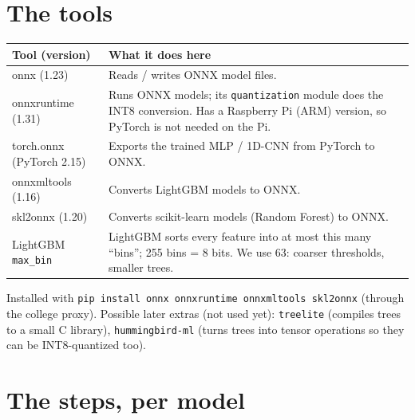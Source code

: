 \documentclass[11pt]{article}
\begin{document}
\section{The tools}
\begin{longtable}{@{}>{\ttfamily\raggedright}p{3.4cm} >{\raggedright\arraybackslash}p{12.4cm}@{}}
\toprule
\textrm{\textbf{Tool (version)}} & \textbf{What it does here} \\
\midrule
\endhead
onnx (1.23) & Reads / writes ONNX model files. \\
onnxruntime (1.31) & Runs ONNX models; its \texttt{quantization} module does the INT8 conversion. Has a Raspberry Pi (ARM) version, so PyTorch is not needed on the Pi. \\
torch.onnx (PyTorch 2.15) & Exports the trained MLP / 1D-CNN from PyTorch to ONNX. \\
onnxmltools (1.16) & Converts LightGBM models to ONNX. \\
skl2onnx (1.20) & Converts scikit-learn models (Random Forest) to ONNX. \\
LightGBM \texttt{max\_bin} & LightGBM sorts every feature into at most this many ``bins''; 255 bins = 8 bits. We use 63: coarser thresholds, smaller trees. \\
\bottomrule
\end{longtable}
Installed with \texttt{pip install onnx onnxruntime onnxmltools skl2onnx} (through the college proxy).
Possible later extras (not used yet): \texttt{treelite} (compiles trees to a small C library), \texttt{hummingbird-ml} (turns trees into tensor operations so they can be INT8-quantized too).

\section{The steps, per model}
\end{document}
